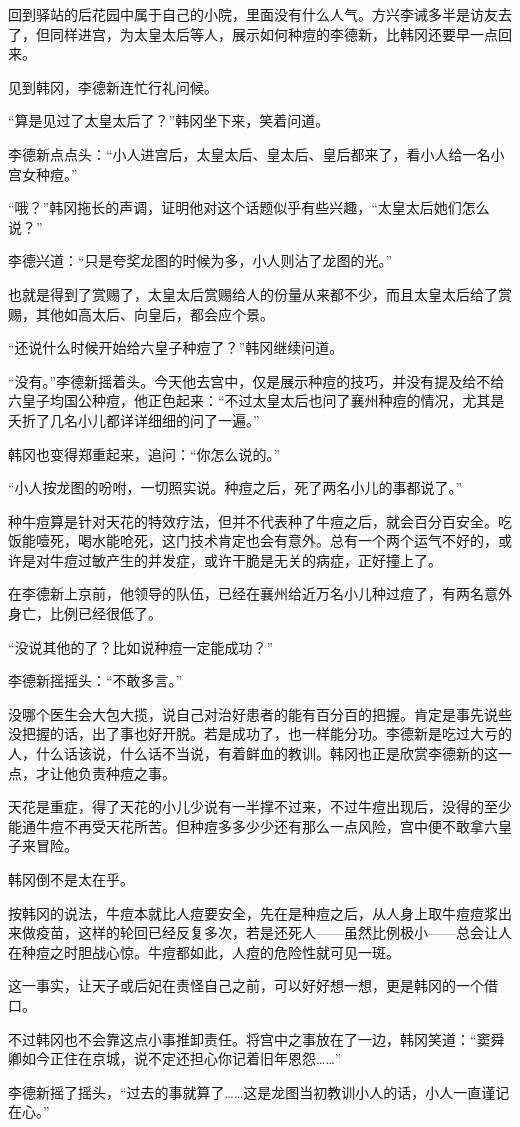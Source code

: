 回到驿站的后花园中属于自己的小院，里面没有什么人气。方兴李诫多半是访友去了，但同样进宫，为太皇太后等人，展示如何种痘的李德新，比韩冈还要早一点回来。

见到韩冈，李德新连忙行礼问候。

“算是见过了太皇太后了？”韩冈坐下来，笑着问道。

李德新点点头：“小人进宫后，太皇太后、皇太后、皇后都来了，看小人给一名小宫女种痘。”

“哦？”韩冈拖长的声调，证明他对这个话题似乎有些兴趣，“太皇太后她们怎么说？”

李德兴道：“只是夸奖龙图的时候为多，小人则沾了龙图的光。”

也就是得到了赏赐了，太皇太后赏赐给人的份量从来都不少，而且太皇太后给了赏赐，其他如高太后、向皇后，都会应个景。

“还说什么时候开始给六皇子种痘了？”韩冈继续问道。

“没有。”李德新摇着头。今天他去宫中，仅是展示种痘的技巧，并没有提及给不给六皇子均国公种痘，他正色起来：“不过太皇太后也问了襄州种痘的情况，尤其是夭折了几名小儿都详详细细的问了一遍。”

韩冈也变得郑重起来，追问：“你怎么说的。”

“小人按龙图的吩咐，一切照实说。种痘之后，死了两名小儿的事都说了。”

种牛痘算是针对天花的特效疗法，但并不代表种了牛痘之后，就会百分百安全。吃饭能噎死，喝水能呛死，这门技术肯定也会有意外。总有一个两个运气不好的，或许是对牛痘过敏产生的并发症，或许干脆是无关的病症，正好撞上了。

在李德新上京前，他领导的队伍，已经在襄州给近万名小儿种过痘了，有两名意外身亡，比例已经很低了。

“没说其他的了？比如说种痘一定能成功？”

李德新摇摇头：“不敢多言。”

没哪个医生会大包大揽，说自己对治好患者的能有百分百的把握。肯定是事先说些没把握的话，出了事也好开脱。若是成功了，也一样能分功。李德新是吃过大亏的人，什么话该说，什么话不当说，有着鲜血的教训。韩冈也正是欣赏李德新的这一点，才让他负责种痘之事。

天花是重症，得了天花的小儿少说有一半撑不过来，不过牛痘出现后，没得的至少能通牛痘不再受天花所苦。但种痘多多少少还有那么一点风险，宫中便不敢拿六皇子来冒险。

韩冈倒不是太在乎。

按韩冈的说法，牛痘本就比人痘要安全，先在是种痘之后，从人身上取牛痘痘浆出来做疫苗，这样的轮回已经反复多次，若是还死人——虽然比例极小——总会让人在种痘之时胆战心惊。牛痘都如此，人痘的危险性就可见一斑。

这一事实，让天子或后妃在责怪自己之前，可以好好想一想，更是韩冈的一个借口。

不过韩冈也不会靠这点小事推卸责任。将宫中之事放在了一边，韩冈笑道：“窦舜卿如今正住在京城，说不定还担心你记着旧年恩怨……”

李德新摇了摇头，“过去的事就算了……这是龙图当初教训小人的话，小人一直谨记在心。”

